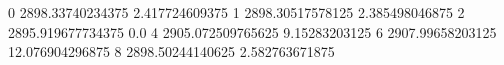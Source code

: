 0 2898.33740234375 2.417724609375
1 2898.30517578125 2.385498046875
2 2895.919677734375 0.0
4 2905.072509765625 9.15283203125
6 2907.99658203125 12.076904296875
8 2898.50244140625 2.582763671875
